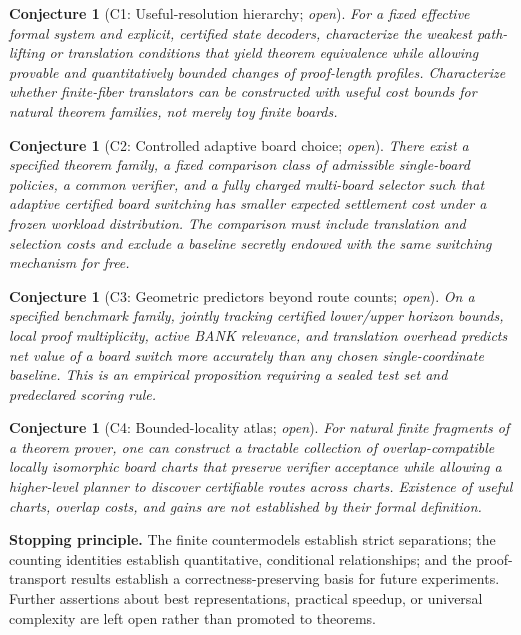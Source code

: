 \documentclass[11pt,letterpaper]{article}
\newtheorem{conjecture}[theorem]{Conjecture}
\theoremstyle{definition}
\begin{document}
\begin{conjecture}[C1: Useful-resolution hierarchy; \emph{open}]
For a fixed effective formal system and explicit, certified state decoders, characterize the weakest path-lifting or translation conditions that yield theorem equivalence while allowing provable and quantitatively bounded changes of proof-length profiles. Characterize whether finite-fiber translators can be constructed with useful cost bounds for natural theorem families, not merely toy finite boards.
\end{conjecture}
\begin{conjecture}[C2: Controlled adaptive board choice; \emph{open}]
There exist a specified theorem family, a fixed comparison class of admissible single-board policies, a common verifier, and a fully charged multi-board selector such that adaptive certified board switching has smaller expected settlement cost under a frozen workload distribution. The comparison must include translation and selection costs and exclude a baseline secretly endowed with the same switching mechanism for free.
\end{conjecture}
\begin{conjecture}[C3: Geometric predictors beyond route counts; \emph{open}]
On a specified benchmark family, jointly tracking certified lower/upper horizon bounds, local proof multiplicity, active BANK relevance, and translation overhead predicts net value of a board switch more accurately than any chosen single-coordinate baseline. This is an empirical proposition requiring a sealed test set and predeclared scoring rule.
\end{conjecture}
\begin{conjecture}[C4: Bounded-locality atlas; \emph{open}]
For natural finite fragments of a theorem prover, one can construct a tractable collection of overlap-compatible locally isomorphic board charts that preserve verifier acceptance while allowing a higher-level planner to discover certifiable routes across charts. Existence of useful charts, overlap costs, and gains are not established by their formal definition.
\end{conjecture}

\noindent\textbf{Stopping principle.} The finite countermodels establish strict separations; the counting identities establish quantitative, conditional relationships; and the proof-transport results establish a correctness-preserving basis for future experiments. Further assertions about best representations, practical speedup, or universal complexity are left open rather than promoted to theorems.
\end{document}
